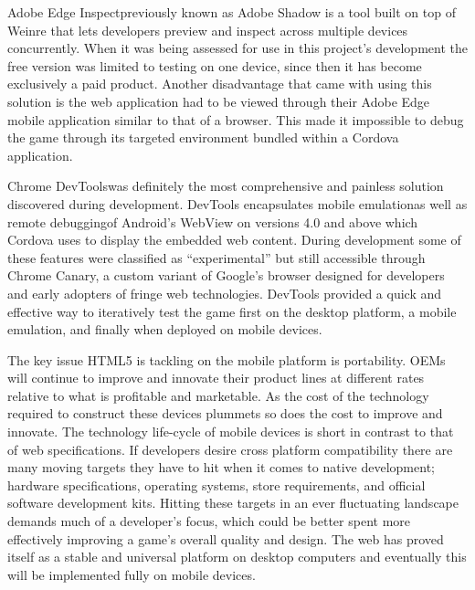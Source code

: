 \documentclass[final]{cmpreport}
\begin{document}

Adobe Edge Inspect\footnotemark previously known as Adobe Shadow is a tool built on top of Weinre that lets developers preview and inspect across multiple devices concurrently. 
When it was being assessed for use in this project's development the free version was limited to testing on one device, since then it has become exclusively a paid product. Another disadvantage that came with using this solution is the web application had to be viewed through their Adobe Edge mobile application similar to that of a browser. This made it impossible to debug the game through its targeted environment bundled within a Cordova application.


Chrome DevTools\footnotemark was definitely the most comprehensive and painless solution discovered during development. DevTools encapsulates mobile emulation\footnotemark as well as remote debugging\footnotemark of Android's WebView on versions 4.0 and above which Cordova uses to display the embedded web content. During development some of these features were classified as ``experimental'' but still accessible through Chrome Canary\footnotemark, a custom variant of Google's browser designed for developers and early adopters of fringe web technologies. DevTools provided a quick and effective way to iteratively test the game first on the desktop platform, a mobile emulation, and finally when deployed on mobile devices.


The key issue HTML5 is tackling on the mobile platform is portability. OEMs will continue to improve and innovate their product lines at different rates relative to what is profitable and marketable. As the cost of the technology required to construct these devices plummets so does the cost to improve and innovate. The technology life-cycle of mobile devices is short in contrast to that of web specifications. If developers desire cross platform compatibility there are many moving targets they have to hit when it comes to native development; hardware specifications, operating systems, store requirements, and official software development kits. Hitting these targets in an ever fluctuating landscape demands much of a developer's focus, which could be better spent more effectively improving a game's overall quality and design. The web has proved itself as a stable and universal platform on desktop computers and eventually this will be implemented fully on mobile devices.
\end{document}
